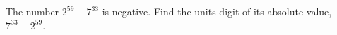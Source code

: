 The number $2^{59}-7^{33}$ is negative. Find the units digit of its absolute value, $7^{33}-2^{59}$.
